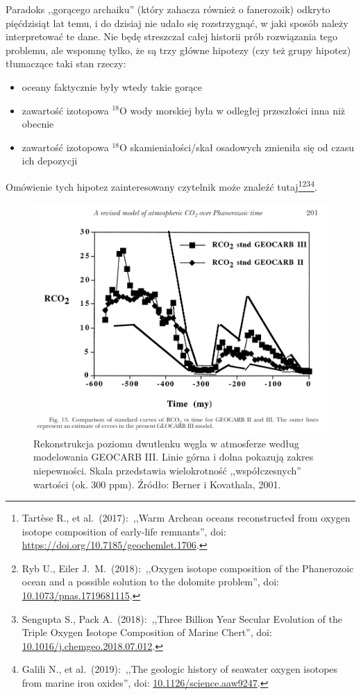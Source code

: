 \documentclass[12pt]{article}
\newcommand{\doi}[1]{doi: \href{htts://doi.org/#1}{#1}}
\begin{document}
Paradoks ,,gorącego archaiku'' (który zahacza również o fanerozoik) odkryto pięćdzisiąt lat temu, i do dzisiaj nie udało się rozstrzygnąć, w jaki sposób należy interpretować te dane. Nie będę streszczał całej historii prób rozwiązania tego problemu, ale wspomnę tylko, że są trzy główne hipotezy (czy też grupy hipotez) tłumaczące taki stan rzeczy:
\begin{itemize}
	\item  oceany faktycznie były wtedy takie gorące
	\item zawartość izotopowa $^{18}$O wody morskiej była w odległej przeszłości inna niż obecnie
	\item zawartość izotopowa $^{18}$O skamieniałości/skał osadowych zmieniła się od czasu ich depozycji
\end{itemize}
	
Omówienie tych hipotez zainteresowany czytelnik może znaleźć tutaj\footnote{Tartèse R., et al.~(2017):~,,Warm Archean oceans reconstructed from oxygen isotope composition of early-life remnants'', \doi{https://doi.org/10.7185/geochemlet.1706}.}\footnote{Ryb U., Eiler J.~M.~(2018):~,,Oxygen isotope composition of the Phanerozoic ocean and a possible solution to the dolomite problem'', \doi{10.1073/pnas.1719681115}.}\footnote{Sengupta S., Pack A.~(2018):~,,Three Billion Year Secular Evolution of the Triple Oxygen Isotope Composition of Marine Chert'', \doi{10.1016/j.chemgeo.2018.07.012}.}\footnote{Galili N., et al.~(2019):~,,The geologic history of seawater oxygen isotopes from marine iron oxides'', \doi{10.1126/science.aaw9247}.}.

\begin{figure}
	\centering
	
	\includegraphics[width=.95\textwidth]{img/berner2001.png}	
	\smallskip\noindent\small Rekonstrukcja poziomu dwutlenku węgla w atmosferze według modelowania GEOCARB III. Linie górna i dolna pokazują zakres niepewności. Skala przedstawia wielokrotność ,,współczesnych'' wartości (ok. 300 ppm). Źródło: Berner i Kovathala, 2001.
\end{figure}
\end{document}
